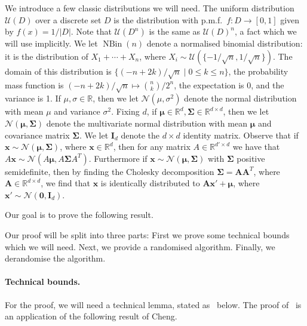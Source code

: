 \documentclass[a4paper,11pt, DIV=11]{scrartcl}
\newcommand{\vx}{\ensuremath{\mathbf{x}}}
\DeclareMathOperator{\NBin}{NBin}
\renewcommand{\R}{\ensuremath{\mathbb{R}}}
\theoremstyle{plain}
\theoremstyle{definition}
\begin{document}
We introduce a few classic distributions we will need. The uniform distribution $\mathcal{U}(D)$ over a discrete set $D$ is the distribution with p.m.f.~$f : D \to [0, 1]$ given by $f(x) = 1 / |D|$. Note that $\mathcal{U}(D^n)$ is the same as ${\mathcal{U}(D)}^n$, a fact which we will use implicitly. We let $\NBin(n)$ denote a normalised binomial distribution: it is the distribution of $X_1 + \cdots + X_n$, where $X_i \sim \mathcal{U}(\{-1/\sqrt{n}, 1/\sqrt{n}\})$. The domain of this distribution is $\{(-n + 2k) / \sqrt{n} \mid 0 \leq k \leq n\}$, the probability mass function is $(-n + 2k)/\sqrt{n} \mapsto \binom{n}{k} / 2^n$, the expectation is 0, and the variance is 1.
If $\mu, \sigma \in \R$, then we let $\mathcal{N}(\mu, \sigma^2)$ denote the normal distribution with mean $\mu$ and variance $\sigma^2$. Fixing $d$, if $\mathbf{\mu} \in \R^d, \mathbf{\Sigma} \in \R^{d\times d}$, then we let $\mathcal{N}(\mathbf{\mu}, \mathbf{\Sigma})$ denote the multivariate normal distribution with mean $\mathbf{\mu}$ and covariance matrix $\mathbf{\Sigma}$. We let $\mathbf{I}_d$ denote the $d \times d$ identity matrix. Observe that if $\mathbf{x} \sim \mathcal{N}( \mathbf{\mu}, \mathbf{\Sigma})$, where $\mathbf{x} \in \R^d$, then for any matrix $A \in \R^{d' \times d}$ we have that $A \mathbf{x} \sim \mathcal{N}(A \mathbf{\mu}, A \mathbf{\Sigma} A^T)$. Furthermore if $\mathbf{x} \sim \mathcal{N}(\mathbf{\mu}, \mathbf{\Sigma})$ with $\mathbf{\Sigma}$ positive semidefinite, then by finding the Cholesky decomposition $\mathbf{\Sigma} = \mathbf{A} \mathbf{A}^T$, where $\mathbf{A} \in \R^{d \times d}$, we find that $\vx$ is identically distributed to $\mathbf{A} \vx' + \mathbf{\mu}$, where $\vx' \sim \mathcal{N}(\mathbf{0}, \mathbf{I}_d)$.

Our goal is to prove the following result.

\thmktwokthree*

Our proof will be split into three parts: First we prove some technical bounds which we will need. Next, we provide a randomised algorithm. Finally, we derandomise the algorithm.

\paragraph{Technical bounds.} For the proof, we will need a technical lemma,
stated as~ below. The proof of~ is an application of the following result of Cheng.
\end{document}
